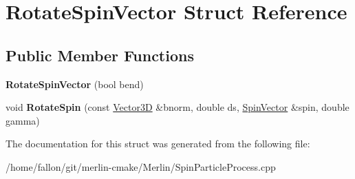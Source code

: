 \hypertarget{structRotateSpinVector}{}\section{Rotate\+Spin\+Vector Struct Reference}
\label{structRotateSpinVector}
\subsection*{Public Member Functions}
\begin{DoxyCompactItemize}
\item 
\mbox{\label{structRotateSpinVector_a901849a84d1e5624e9bd7b84163165cf}} 
{\bfseries Rotate\+Spin\+Vector} (bool bend)
\item 
\mbox{\label{structRotateSpinVector_ad1cd2088b37c80bcc374d9e7bd9bebad}} 
void {\bfseries Rotate\+Spin} (const \hyperlink{classTVec3D}{Vector3D} \&bnorm, double ds, \hyperlink{classSpinVector}{Spin\+Vector} \&spin, double gamma)
\end{DoxyCompactItemize}


The documentation for this struct was generated from the following file\+:\begin{DoxyCompactItemize}
\item 
/home/fallon/git/merlin-\/cmake/\+Merlin/Spin\+Particle\+Process.\+cpp\end{DoxyCompactItemize}
